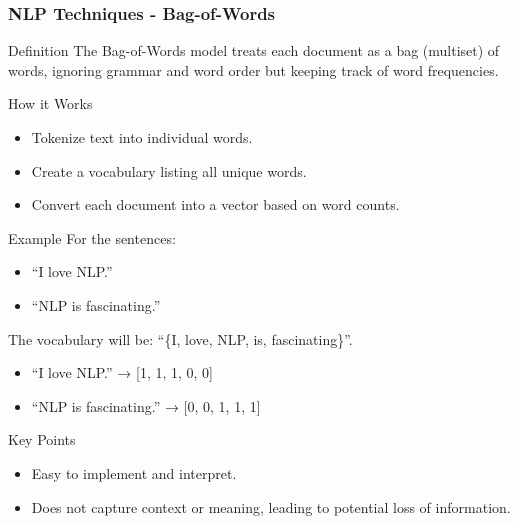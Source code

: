 \documentclass[aspectratio=169]{beamer}
\begin{document}
\begin{frame}[fragile]
  \frametitle{NLP Techniques - Bag-of-Words}
  \begin{block}{Definition}
    The Bag-of-Words model treats each document as a bag (multiset) of words, ignoring grammar and word order but keeping track of word frequencies.
  \end{block}

  \begin{block}{How it Works}
    \begin{itemize}
      \item Tokenize text into individual words.
      \item Create a vocabulary listing all unique words.
      \item Convert each document into a vector based on word counts.
    \end{itemize}
  \end{block}

  \begin{block}{Example}
    For the sentences:
    \begin{itemize}
      \item ``I love NLP.''
      \item ``NLP is fascinating.''
    \end{itemize}
    The vocabulary will be: ``\{I, love, NLP, is, fascinating\}''.
    \begin{itemize}
      \item ``I love NLP.'' → [1, 1, 1, 0, 0]
      \item ``NLP is fascinating.'' → [0, 0, 1, 1, 1]
    \end{itemize}
  \end{block}

  \begin{block}{Key Points}
    \begin{itemize}
      \item Easy to implement and interpret.
      \item Does not capture context or meaning, leading to potential loss of information.
    \end{itemize}
  \end{block}
\end{frame}
\end{document}
